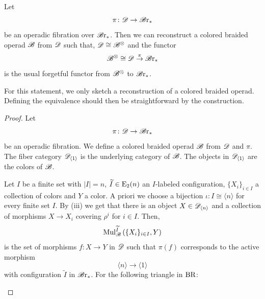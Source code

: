 \begin{prop}
    Let
    \[
        \pi \colon \mathscr{D} \to \mathscr{B} \text{r}_{\ast}
    \]
    be an operadic fibration over $\mathscr{B} \text{r}_{\ast}$. Then we can reconstruct a colored
    braided operad $\mathscr{B}$ from $\mathscr{D}$ such that, $\mathscr{D} \cong \mathscr{B}^{\otimes}$ and the functor
    \[
        \mathscr{B}^{\otimes} \cong \mathscr{D} \overset{\pi}{\to} \mathscr{B} \text{r}_{\ast}
    \]
    is the usual forgetful functor from $\mathscr{B}^{\otimes}$ to $\mathscr{B} \text{r}_{\ast}$.
\end{prop}
For this statement, we only sketch a reconstruction of a colored braided
operad. Defining the equivalence should then be straightforward by the
construction.

\begin{proof}
    Let
    \[
        \pi \colon \mathscr{D} \to \mathscr{B} \text{r}_{\ast}
    \]
    be an operadic fibration. We define a colored braided operad $\mathscr{B}$ from
    $\mathscr{D}$ and $\pi$. The fiber category $\mathscr{D}_{\langle 1 \rangle}$ is the
    underlying category of $\mathscr{B}$. The objects in $\mathscr{D}_{\langle 1 \rangle}$ are the
    colors of $\mathscr{B}$. 
    
    Let $I$ be a finite set with $|I|=n$, $\widetilde{I} \in \operatorname{E}_2(n)$ an
    $I$-labeled configuration, $\{X_i\}_{i \in I}$ a collection of colors and
    $Y$ a color. A priori we choose a bijection $\iota \colon I \cong \langle n
    \rangle$ for every finite set $I$. 
    By (iii) we get that there is an object $X \in \mathscr{D}_{\langle n
    \rangle}$ and a collection of morphisms $X \to X_i$ covering $\rho^i$ for $i
    \in I$. Then, 
    \[
        \operatorname{Mul}_{\mathscr{B}}^{\widetilde{I}}\left(\{X_i\}_{i \in I}, Y\right)
    \]
    is the set of morphisms $f \colon X \to Y$ in $\mathscr{D}$ such that $\pi(f)$
    corresponds to the active morphism
    \[
        \langle n \rangle \to \langle 1 \rangle
    \]
    with configuration $\widetilde{I}$ in $\mathscr{B} \text{r}_{\ast}$.
    For the following triangle in $\operatorname{BR}$:
            \begin{center}
\end{center}
\end{proof}
